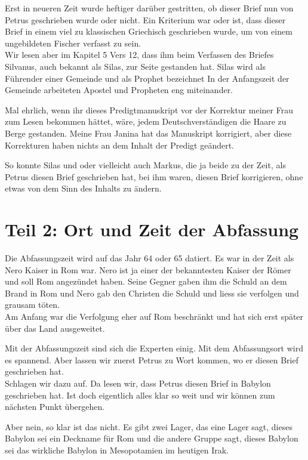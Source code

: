 \documentclass[fontsize=16pt]{mybib}
\begin{document}
Erst in neueren Zeit wurde heftiger darüber gestritten, ob dieser Brief nun von Petrus geschrieben wurde oder nicht. Ein Kriterium war oder ist, dass dieser Brief in einem viel zu klassischen Griechisch geschrieben wurde, um von einem ungebildeten Fischer verfasst zu sein.\\
Wir lesen aber im Kapitel 5 Vers 12, dass ihm beim Verfassen des Briefes Silvanus, auch bekannt als Silas, zur Seite gestanden hat.
Silas wird als Führender einer Gemeinde
und als Prophet bezeichnet
In der Anfangszeit der Gemeinde arbeiteten Apostel und Propheten eng miteinander. 

Mal ehrlich, wenn ihr dieses Predigtmanuskript vor der Korrektur meiner Frau zum Lesen bekommen hättet, wäre, jedem Deutschverständigen die Haare zu Berge gestanden. Meine Frau Janina hat das Manuskript korrigiert, aber diese Korrekturen haben nichts an dem Inhalt der Predigt geändert. 

So konnte Silas und oder vielleicht auch Markus, die ja beide zu der Zeit, als Petrus diesen Brief geschrieben hat, bei ihm waren, diesen Brief korrigieren, ohne etwas von dem Sinn des Inhalts zu ändern. 

\section{Teil 2: Ort und Zeit der Abfassung}
Die Abfassungszeit wird auf das Jahr 64 \nChr{} oder 65 \nChr{} datiert. Es war in der Zeit als Nero Kaiser in Rom war. Nero ist ja einer der bekanntesten Kaiser der Römer und soll Rom angezündet haben. Seine Gegner gaben ihm die Schuld an dem Brand in Rom und Nero gab den Christen die Schuld und liess sie verfolgen und grausam töten.\\
Am Anfang war die Verfolgung eher auf Rom beschränkt und hat sich erst später über das Land ausgeweitet.

Mit der Abfassungszeit sind sich die Experten einig. Mit dem Abfassungsort wird es spannend. Aber lassen wir zuerst Petrus zu Wort kommen, wo er diesen Brief geschrieben hat.\\
Schlagen wir dazu  auf. Da lesen wir, dass Petrus diesen Brief in Babylon geschrieben hat. Ist doch eigentlich alles klar so weit und wir können zum nächsten Punkt übergehen.

Aber nein, so klar ist das nicht. Es gibt zwei Lager, das eine Lager sagt, dieses Babylon sei ein Deckname für Rom und die andere Gruppe sagt, dieses Babylon sei das wirkliche Babylon in Mesopotamien im heutigen Irak.
\end{document}

